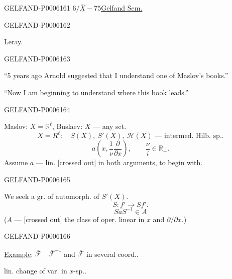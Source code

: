 \begin{GelfandAdjacentEvidence}{GELFAND-P000616}{1}
\underline{\(6/\overline{\underline X}-75\)}\qquad\underline{Gelfand Sem.}
\end{GelfandAdjacentEvidence}
\begin{GelfandAdjacentEvidence}{GELFAND-P000616}{2}


Leray.
\end{GelfandAdjacentEvidence}
\begin{GelfandAdjacentEvidence}{GELFAND-P000616}{3}

“5 years ago Arnold suggested that I understand one of Maslov’s books.”

“Now I am beginning to understand where this book leads.”
\end{GelfandAdjacentEvidence}
\begin{GelfandAdjacentEvidence}{GELFAND-P000616}{4}




Maslov: \(X=\mathbb R^\ell\), Buslaev: \(X\) — any set.
\[
X=R^\ell:\quad S(X),\ S'(X),\ \mathcal H(X)\text{ — intermed. Hilb. sp..}
\]
\[
a\left(x,\frac1\nu\frac\partial{\partial x}\right),\qquad
\frac\nu i\in\mathbb R_+.
\]
Assume \(a\) — lin. [crossed out] in both arguments, to begin with.
\end{GelfandAdjacentEvidence}
\begin{GelfandAdjacentEvidence}{GELFAND-P000616}{5}

We seek a gr. of automorph. of \(S'(X)\).
\[
S:f'\longrightarrow Sf'.
\]
\[
SaS^{-1}\in A
\]
(\(A\) — [crossed out] the class of oper. linear in \(x\) and \(\partial/\partial x\).)
\end{GelfandAdjacentEvidence}
\begin{GelfandAdjacentEvidence}{GELFAND-P000616}{6}


\underline{Example}: \(\overline{\mathcal F}\quad\overline{\mathcal F}^{-1}\)
and \(\overline{\mathcal F}\) in several coord..

lin. change of var. in \(x\)-sp..
\end{GelfandAdjacentEvidence}

